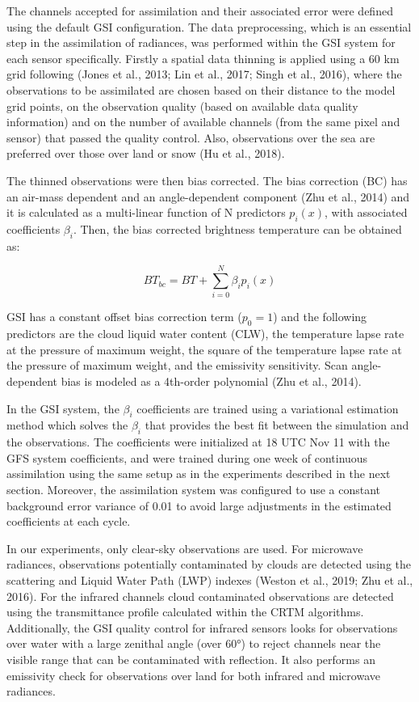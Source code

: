 \documentclass[final,5p,times,twocolumn,authoryear]{elsarticle} %
\begin{document}
The channels accepted for assimilation and their associated error were defined using the default GSI configuration. The data preprocessing, which is an essential step in the assimilation of radiances, was performed within the GSI system for each sensor specifically. Firstly a spatial data thinning is applied using a 60 km grid following (Jones et al., 2013; Lin et al., 2017; Singh et al., 2016), where the observations to be assimilated are chosen based on their distance to the model grid points, on the observation quality (based on available data quality information) and on the number of available channels (from the same pixel and sensor) that passed the quality control. Also, observations over the sea are preferred over those over land or snow (Hu et al., 2018).

The thinned observations were then bias corrected. The bias correction (BC) has an air-mass dependent and an angle-dependent component (Zhu et al., 2014) and it is calculated as a multi-linear function of N predictors \(p_i(x)\), with associated coefficients \(\beta_i\). Then, the bias corrected brightness temperature can be obtained as:

\[\mathit{BT_{bc}} =\mathit{ BT} + \sum_{i = 0}^{N} \beta_i p_i (x)\]

GSI has a constant offset bias correction term (\(p_0 = 1\)) and the following predictors are the cloud liquid water content (CLW), the temperature lapse rate at the pressure of maximum weight, the square of the temperature lapse rate at the pressure of maximum weight, and the emissivity sensitivity. Scan angle-dependent bias is modeled as a 4th-order polynomial (Zhu et al., 2014).

In the GSI system, the \(\beta_i\) coefficients are trained using a variational estimation method which solves the \(\beta_i\) that provides the best fit between the simulation and the observations. The coefficients were initialized at 18 UTC Nov 11 with the GFS system coefficients, and were trained during one week of continuous assimilation using the same setup as in the experiments described in the next section. Moreover, the assimilation system was configured to use a constant background error variance of 0.01 to avoid large adjustments in the estimated coefficients at each cycle.

In our experiments, only clear-sky observations are used. For microwave radiances, observations potentially contaminated by clouds are detected using the scattering and Liquid Water Path (LWP) indexes (Weston et al., 2019; Zhu et al., 2016). For the infrared channels cloud contaminated observations are detected using the transmittance profile calculated within the CRTM algorithms. Additionally, the GSI quality control for infrared sensors looks for observations over water with a large zenithal angle (over 60°) to reject channels near the visible range that can be contaminated with reflection. It also performs an emissivity check for observations over land for both infrared and microwave radiances.
\end{document}

